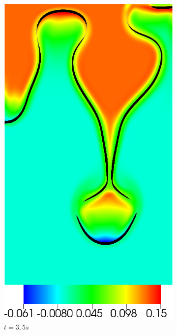 \begin{figure}[H]
	\centering
	\ContinuedFloat
	\begin{subfigure}[ht!]{0.2\textwidth}
		\centering
		\includegraphics[width=1\textwidth]{figure/PT_RT/concent0/visit0011.png}
		\caption{$t=3,5s$}
	\end{subfigure}
	\begin{subfigure}[ht!]{0.2\textwidth}

\end{subfigure}
\end{figure}
